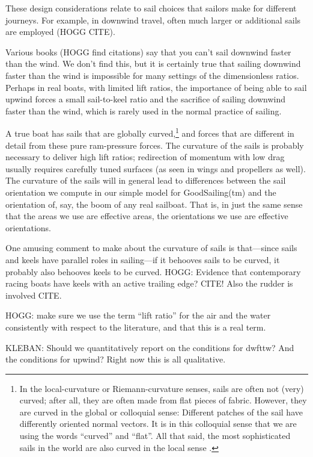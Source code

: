 \documentclass[letterpaper]{article}
\begin{document}
These design considerations relate to sail choices that sailors make for different journeys.
For example, in downwind travel, often much larger or additional sails are employed (HOGG CITE).

Various books (HOGG find citations) say that you can't sail downwind faster than the wind.
We don't find this, but it is certainly true that sailing downwind faster than the wind is impossible for many settings of the dimensionless ratios.
Perhaps in real boats, with limited lift ratios, the importance of being able to sail upwind forces a small sail-to-keel ratio and the sacrifice of sailing downwind faster than the wind, which is rarely used in the normal practice of sailing.

A true boat has sails that are globally curved,\footnote{%
In the local-curvature or Riemann-curvature senses, sails are often not (very) curved; after all, they are often made from flat pieces of fabric.
However, they are curved in the global or colloquial sense: Different patches of the sail have differently oriented normal vectors.
It is in this colloquial sense that we are using the words ``curved'' and ``flat''.
All that said, the most sophisticated sails in the world are also curved in the local sense \cite{sails}.}
and forces that are different in detail from these pure ram-pressure forces.
The curvature of the sails is probably necessary to deliver high lift ratios; redirection of momentum with low drag usually requires carefully tuned surfaces (as seen in wings and propellers as well).
The curvature of the sails will in general lead to differences between the sail orientation we compute in our simple model for GoodSailing(tm) and the orientation of, say, the boom of any real sailboat.
That is, in just the same sense that the areas we use are effective areas, the orientations we use are effective orientations.

One amusing comment to make about the curvature of sails is that---since sails and keels have parallel roles in sailing---if it behooves sails to be curved, it probably also behooves keels to be curved.
HOGG: Evidence that contemporary racing boats have keels with an active trailing edge? CITE! Also the rudder is involved CITE.

HOGG: make sure we use the term ``lift ratio'' for the air and the water consistently with respect to the literature, and that this is a real term.

KLEBAN: Should we quantitatively report on the conditions for dwfttw? And the conditions for upwind? Right now this is all qualitative.
\end{document}
